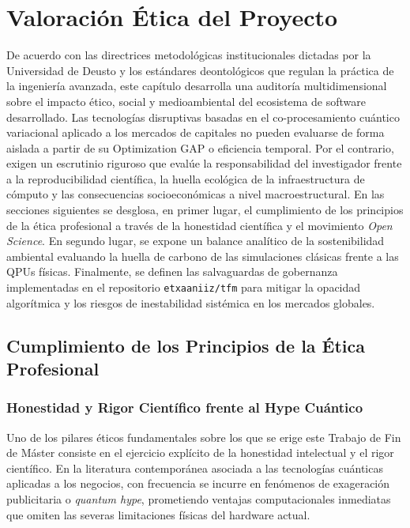 \chapter{Valoración Ética del Proyecto}
\label{ch:valoracion_etica}

De acuerdo con las directrices metodológicas institucionales dictadas por la Universidad de Deusto \cite{DeustoEthics2024} y los estándares deontológicos que regulan la práctica de la ingeniería avanzada, este capítulo desarrolla una auditoría multidimensional sobre el impacto ético, social y medioambiental del ecosistema de software desarrollado. Las tecnologías disruptivas basadas en el co-procesamiento cuántico variacional aplicado a los mercados de capitales no pueden evaluarse de forma aislada a partir de su Optimization GAP o eficiencia temporal. Por el contrario, exigen un escrutinio riguroso que evalúe la responsabilidad del investigador frente a la reproducibilidad científica, la huella ecológica de la infraestructura de cómputo y las consecuencias socioeconómicas a nivel macroestructural. En las secciones siguientes se desglosa, en primer lugar, el cumplimiento de los principios de la ética profesional a través de la honestidad científica y el movimiento \textit{Open Science}. En segundo lugar, se expone un balance analítico de la sostenibilidad ambiental evaluando la huella de carbono de las simulaciones clásicas frente a las QPUs físicas. Finalmente, se definen las salvaguardas de gobernanza implementadas en el repositorio \texttt{etxaaniiz/tfm} para mitigar la opacidad algorítmica y los riesgos de inestabilidad sistémica en los mercados globales.

\section{Cumplimiento de los Principios de la Ética Profesional}
\label{sec:cumplimiento_etica_profesional}

\subsection{Honestidad y Rigor Científico frente al Hype Cuántico}
Uno de los pilares éticos fundamentales sobre los que se erige este Trabajo de Fin de Máster consiste en el ejercicio explícito de la honestidad intelectual y el rigor científico. En la literatura contemporánea asociada a las tecnologías cuánticas aplicadas a los negocios, con frecuencia se incurre en fenómenos de exageración publicitaria o \textit{quantum hype}, prometiendo ventajas computacionales inmediatas que omiten las severas limitaciones físicas del hardware actual. 

